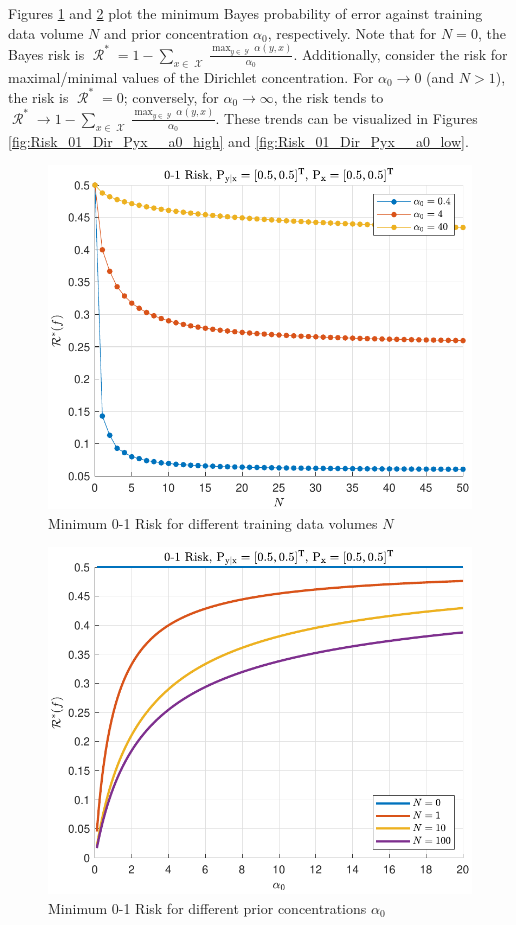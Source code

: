 \documentclass[12pt]{report}
\DeclareMathOperator{\Xcal}{\mathcal{X}}
\DeclareMathOperator{\Ycal}{\mathcal{Y}}
\DeclareMathOperator{\Rcal}{\mathcal{R}}
\begin{document}
Figures \ref{fig:Risk_01_Dir_N_leg_a0} and \ref{fig:Risk_01_Dir_a0_leg_N} plot the minimum Bayes probability of error against training data volume $N$ and prior concentration $\alpha_0$, respectively. Note that for $N = 0$, the Bayes risk is $\Rcal^* = 1 - \sum_{x \in \Xcal} \frac{\max_{y \in \Ycal} \alpha(y,x)}{\alpha_0}$. Additionally, consider the risk for maximal/minimal values of the Dirichlet concentration. For $\alpha_0 \to 0$ (and $N > 1$), the risk is $\Rcal^* = 0$; conversely, for $\alpha_0 \to \infty$, the risk tends to $\Rcal^* \to 1 - \sum_{x \in \Xcal} \frac{\max_{y \in \Ycal} \alpha(y,x)}{\alpha_0}$. These trends can be visualized in Figures \ref{fig:Risk_01_Dir_Pyx__a0_high} and \ref{fig:Risk_01_Dir_Pyx__a0_low}.
%
\begin{figure}
\centering
\includegraphics[width=0.7\linewidth]{Risk_01_Dir_N_leg_a0.pdf}
\caption{Minimum 0-1 Risk for different training data volumes $N$}
\label{fig:Risk_01_Dir_N_leg_a0}
\end{figure}
%
\begin{figure}
\centering
\includegraphics[width=0.7\linewidth]{Risk_01_Dir_a0_leg_N.pdf}
\caption{Minimum 0-1 Risk for different prior concentrations $\alpha_0$}
\label{fig:Risk_01_Dir_a0_leg_N}
\end{figure}
\end{document}
